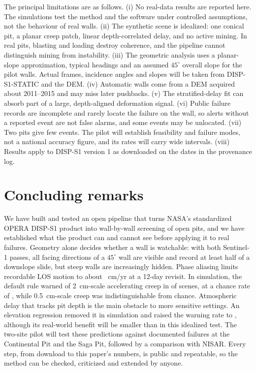 \documentclass[aps,prd,twocolumn,superscriptaddress,nofootinbib,floatfix,preprintnumbers,10pt]{revtex4-2}
\begin{document}
The principal limitations are as follows. (i) No real-data results are reported here. The simulations test the method and the software under controlled assumptions, not the behaviour of real walls. (ii) The synthetic scene is idealized: one conical pit, a planar creep patch, linear depth-correlated delay, and no active mining. In real pits, blasting and loading destroy coherence, and the pipeline cannot distinguish mining from instability. (iii) The geometric analysis uses a planar-slope approximation, typical headings and an assumed $45^\circ$ overall slope for the pilot walls. Actual frames, incidence angles and slopes will be taken from DISP-S1-STATIC and the DEM. (iv) Automatic walls come from a DEM acquired about 2011--2015 and may miss later pushbacks. (v) The stratified-delay fit can absorb part of a large, depth-aligned deformation signal. (vi) Public failure records are incomplete and rarely locate the failure on the wall, so alerts without a reported event are not false alarms, and some events may be unlocated. (vii) Two pits give few events. The pilot will establish feasibility and failure modes, not a national accuracy figure, and its rates will carry wide intervals. (viii) Results apply to DISP-S1 version 1 as downloaded on the dates in the provenance log.

\section{Concluding remarks}\label{sec:conclusions}

We have built and tested an open pipeline that turns NASA's standardized OPERA DISP-S1 product into wall-by-wall screening of open pits, and we have established what the product can and cannot see before applying it to real failures. Geometry alone decides whether a wall is watchable: with both Sentinel-1 passes, all facing directions of a $45^\circ$ wall are visible and \GeoSensEitherFortyFive{} record at least half of a downslope slide, but steep walls are increasingly hidden. Phase aliasing limits recordable LOS motion to about \AliasTwelve{}~cm/yr at a 12-day revisit. In simulation, the default rule warned of 2~cm-scale accelerating creep in \WTwoOneTwenty{} of scenes, at a chance rate of \Chance, while 0.5~cm-scale creep was indistinguishable from chance. Atmospheric delay that tracks pit depth is the main obstacle to more sensitive settings. An elevation regression removed it in simulation and raised the warning rate to \WTwoOneTwentyCor{}, although its real-world benefit will be smaller than in this idealized test. The two-site pilot will test these predictions against documented failures at the Continental Pit and the Saga Pit, followed by a comparison with NISAR. Every step, from download to this paper's numbers, is public and repeatable, so the method can be checked, criticized and extended by anyone.
\end{document}
